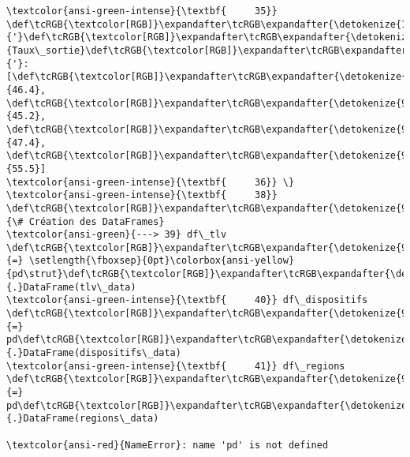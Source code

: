 \documentclass[11pt]{article}
\begin{document}
\begin{Verbatim}[commandchars=\\\{\}, frame=single, framerule=2mm, rulecolor=\color{outerrorbackground}]
\textcolor{ansi-green-intense}{\textbf{     35}}     \def\tcRGB{\textcolor[RGB]}\expandafter\tcRGB\expandafter{\detokenize{175,0,0}}{'}\def\tcRGB{\textcolor[RGB]}\expandafter\tcRGB\expandafter{\detokenize{175,0,0}}{Taux\_sortie}\def\tcRGB{\textcolor[RGB]}\expandafter\tcRGB\expandafter{\detokenize{175,0,0}}{'}: [\def\tcRGB{\textcolor[RGB]}\expandafter\tcRGB\expandafter{\detokenize{98,98,98}}{46.4}, \def\tcRGB{\textcolor[RGB]}\expandafter\tcRGB\expandafter{\detokenize{98,98,98}}{45.2}, \def\tcRGB{\textcolor[RGB]}\expandafter\tcRGB\expandafter{\detokenize{98,98,98}}{47.4}, \def\tcRGB{\textcolor[RGB]}\expandafter\tcRGB\expandafter{\detokenize{98,98,98}}{55.5}]
\textcolor{ansi-green-intense}{\textbf{     36}} \}
\textcolor{ansi-green-intense}{\textbf{     38}} \def\tcRGB{\textcolor[RGB]}\expandafter\tcRGB\expandafter{\detokenize{95,135,135}}{\# Création des DataFrames}
\textcolor{ansi-green}{---> 39} df\_tlv \def\tcRGB{\textcolor[RGB]}\expandafter\tcRGB\expandafter{\detokenize{98,98,98}}{=} \setlength{\fboxsep}{0pt}\colorbox{ansi-yellow}{pd\strut}\def\tcRGB{\textcolor[RGB]}\expandafter\tcRGB\expandafter{\detokenize{98,98,98}}{.}DataFrame(tlv\_data)
\textcolor{ansi-green-intense}{\textbf{     40}} df\_dispositifs \def\tcRGB{\textcolor[RGB]}\expandafter\tcRGB\expandafter{\detokenize{98,98,98}}{=} pd\def\tcRGB{\textcolor[RGB]}\expandafter\tcRGB\expandafter{\detokenize{98,98,98}}{.}DataFrame(dispositifs\_data)
\textcolor{ansi-green-intense}{\textbf{     41}} df\_regions \def\tcRGB{\textcolor[RGB]}\expandafter\tcRGB\expandafter{\detokenize{98,98,98}}{=} pd\def\tcRGB{\textcolor[RGB]}\expandafter\tcRGB\expandafter{\detokenize{98,98,98}}{.}DataFrame(regions\_data)

\textcolor{ansi-red}{NameError}: name 'pd' is not defined
    \end{Verbatim}
\end{document}
